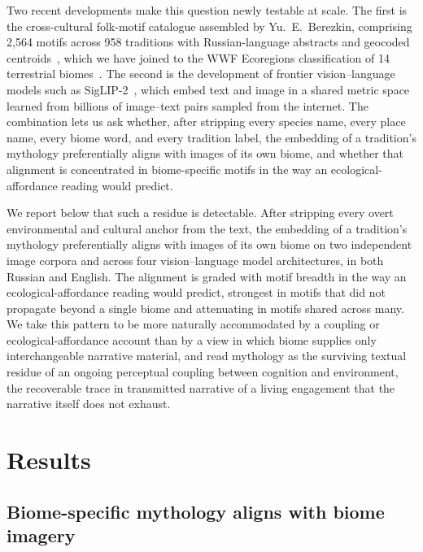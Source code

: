 \documentclass[11pt,a4paper]{article}
\begin{document}
Two recent developments make this question newly testable at scale.
The first is the cross-cultural folk-motif catalogue assembled by
Yu.\ E.\ Berezkin, comprising 2{,}564 motifs across 958 traditions
with Russian-language abstracts and geocoded
centroids~\citep{berezkin2024catalogue}, which we have joined to the
WWF Ecoregions classification of 14 terrestrial
biomes~\citep{olson2001terrestrial}. The second is the development of
frontier vision--language models such as
SigLIP-2~\citep{tschannen2024siglip2}, which embed text and image in a
shared metric space learned from billions of image--text pairs sampled
from the internet. The combination lets us ask whether, after
stripping every species name, every place name, every biome word, and
every tradition label, the embedding of a tradition's mythology
preferentially aligns with images of its own biome, and whether
that alignment is concentrated in biome-specific motifs in the
way an ecological-affordance reading would predict.

We report below that such a residue is detectable. After stripping
every overt environmental and cultural anchor from the text, the embedding of a tradition's mythology
preferentially aligns with images of its own biome on two
independent image corpora and across four vision--language model
architectures, in both Russian and English. The alignment is
graded with motif breadth in the way an ecological-affordance
reading would predict, strongest in motifs that did not propagate
beyond a single biome and attenuating in motifs shared across
many. We take this pattern to be more naturally accommodated by a
coupling or ecological-affordance account than by a view in which
biome supplies only interchangeable narrative material, and read
mythology as the surviving textual residue of an ongoing
perceptual coupling between cognition and environment, the
recoverable trace in transmitted narrative of a living engagement
that the narrative itself does not exhaust.

\section*{Results}

\subsection*{Biome-specific mythology aligns with biome imagery}
\end{document}
